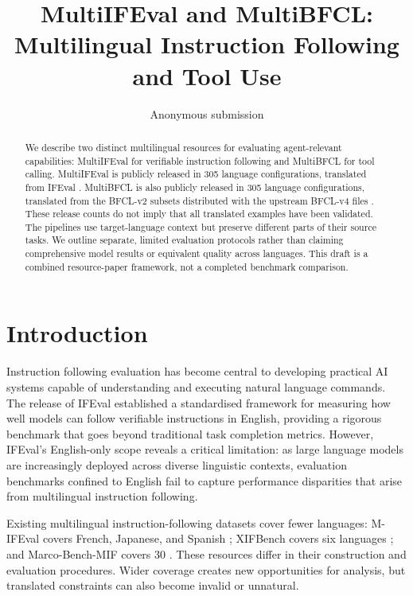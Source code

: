 \documentclass[11pt]{article}
\title{MultiIFEval and MultiBFCL: Multilingual Instruction Following and Tool Use}
\author{Anonymous submission}
\begin{document}
\maketitle


\begin{abstract}

We describe two distinct multilingual resources for evaluating agent-relevant
capabilities: MultiIFEval for verifiable instruction following and MultiBFCL for
tool calling. MultiIFEval is publicly released in 305 language configurations,
translated from IFEval \cite{zhou2023ifeval}. MultiBFCL is also publicly released
in 305 language configurations, translated from the BFCL-v2 subsets distributed
with the upstream BFCL-v4 files \cite{bfcl-upstream}. These release counts do not
imply that all translated examples have been validated. The pipelines use target-language context but preserve different
parts of their source tasks. We outline separate, limited evaluation protocols
rather than claiming comprehensive model results or equivalent quality across
languages. This draft is a combined resource-paper framework, not a completed
benchmark comparison.

\end{abstract}


\section{Introduction}
\label{sec:intro}

Instruction following evaluation has become central to developing practical AI systems
capable of understanding and executing natural language commands. The release of IFEval
\cite{zhou2023ifeval} established a standardised framework for measuring how well models
can follow verifiable instructions in English, providing a rigorous benchmark that goes
beyond traditional task completion metrics. However, IFEval's English-only scope reveals
a critical limitation: as large language models are increasingly deployed across diverse
linguistic contexts, evaluation benchmarks confined to English fail to capture
performance disparities that arise from multilingual instruction following.

Existing multilingual instruction-following datasets cover fewer languages:
M-IFEval covers French, Japanese, and Spanish \cite{dussolle-etal-2025-ifeval};
XIFBench covers six languages \cite{li2025xifbench}; and Marco-Bench-MIF covers
30 \cite{zeng-etal-2025-marco}. These resources differ in their construction and
evaluation procedures. Wider coverage creates new opportunities for analysis, but
translated constraints can also become invalid or unnatural.
\end{document}
